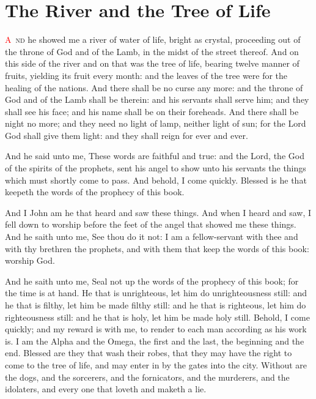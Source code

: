 
\chapter{The River and the Tree of Life}
\lettrine[lines=3,slope=0.5em]{\textcolor{red}{A}}{\ nd} he showed me a river of water of life, bright as crystal, proceeding out of the throne of God and of the Lamb, 
 in the midst of the street thereof. And on this side of the river and on that was the tree of life, bearing twelve manner of fruits, yielding its fruit every month: and the leaves of the tree were for the healing of the nations. 
 And there shall be no curse any more: and the throne of God and of the Lamb shall be therein: and his servants shall serve him; 
 and they shall see his face; and his name shall be on their foreheads. 
 And there shall be night no more; and they need no light of lamp, neither light of sun; for the Lord God shall give them light: and they shall reign for ever and ever.

 And he said unto me, These words are faithful and true: and the Lord, the God of the spirits of the prophets, sent his angel to show unto his servants the things which must shortly come to pass. 
 And behold, I come quickly. Blessed is he that keepeth the words of the prophecy of this book.

 And I John am he that heard and saw these things. And when I heard and saw, I fell down to worship before the feet of the angel that showed me these things. 
 And he saith unto me, See thou do it not: I am a fellow-servant with thee and with thy brethren the prophets, and with them that keep the words of this book: worship God.

 And he saith unto me, Seal not up the words of the prophecy of this book; for the time is at hand. 
 He that is unrighteous, let him do unrighteousness still: and he that is filthy, let him be made filthy still: and he that is righteous, let him do righteousness still: and he that is holy, let him be made holy still. 
 Behold, I come quickly; and my reward is with me, to render to each man according as his work is. 
 I am the Alpha and the Omega, the first and the last, the beginning and the end. 
 Blessed are they that wash their robes, that they may have the right to come to the tree of life, and may enter in by the gates into the city. 
 Without are the dogs, and the sorcerers, and the fornicators, and the murderers, and the idolaters, and every one that loveth and maketh a lie.

